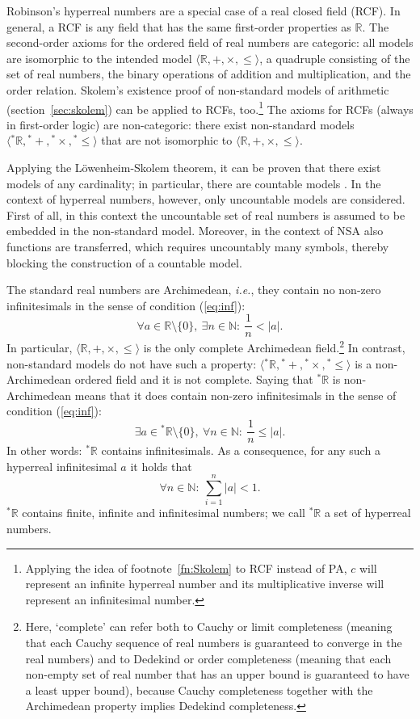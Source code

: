 Robinson's hyperreal numbers are a special case of a real closed field (RCF). In general, a RCF is any field that has the same first-order properties as $\mathbb{R}$.
The second-order axioms for the ordered field of real numbers are categoric: all models are isomorphic to the intended model $\langle \mathbb{R}, +, \times, \leq \rangle$, a quadruple consisting of the set of real numbers, the binary operations of addition and multiplication, and the order relation.
Skolem's existence proof of non-standard models of arithmetic (section~\ref{sec:skolem}) can be applied to RCFs, too.\footnote{Applying the idea of footnote~\ref{fn:Skolem} to RCF instead of PA, $c$ will represent an infinite hyperreal number and its multiplicative inverse will represent an infinitesimal number.}
The axioms for RCFs (always in first-order logic) are non-categoric: there exist non-standard models $\langle {^\ast\mathbb{R}}, {^\ast +}, {^\ast \times}, {^\ast \! \leq} \rangle$ that are not isomorphic to $\langle \mathbb{R}, +, \times, \leq \rangle$.

Applying the L\"{o}wenheim-Skolem theorem, it can be proven that there exist models of any cardinality; in particular, there are countable models \citep[\textit{cf.}\ the `paradox' of][]{Skolem:1922}.
In the context of hyperreal numbers, however, only uncountable models are considered. First of all, in this context the uncountable set of real numbers is assumed to be embedded in the non-standard model. Moreover, in the context of NSA also functions are transferred, which requires uncountably many symbols, thereby blocking the construction of a countable model.

The standard real numbers are Archimedean, \textit{i.e.}, they contain no non-zero infinitesimals in the sense of condition (\ref{eq:inf}):
\begin{equation}
	\forall a \in \mathbb{R} \setminus \{0\}, \ \exists n \in \mathbb{N} : \ \frac{1}{n} < | a |.\label{eq:Arch}
\end{equation}
In particular, $\langle \mathbb{R}, +, \times, \leq \rangle$ is the only complete Archimedean field.\footnote{Here, `complete' can refer both to Cauchy or limit completeness (meaning that each Cauchy sequence of real numbers is guaranteed to converge in the real numbers) and to Dedekind or order completeness (meaning that each non-empty set of real number that has an upper bound is guaranteed to have a least upper bound), because Cauchy completeness together with the Archimedean property implies Dedekind completeness.}
In contrast, non-standard models do not have such a property: $\langle {^\ast\mathbb{R}}, {^\ast +}, {^\ast \times}, {^\ast \leq} \rangle$ is a non-Archimedean ordered field and it is not complete.
Saying that ${^\ast\mathbb{R}}$ is non-Archimedean means that it does contain non-zero infinitesimals in the sense of condition (\ref{eq:inf}):
$$
	\exists a \in {^\ast\mathbb{R}} \setminus \{0\}, \ \forall n \in \mathbb{N} : \ \frac{1}{n} \leq | a |.
$$
In other words: ${^\ast\mathbb{R}}$ contains infinitesimals. As a consequence, for any such a hyperreal infinitesimal $a$ it holds that
$$
	\forall n \in \mathbb{N} : \ \sum_{i=1}^{n} | a | < 1.
$$
${^\ast\mathbb{R}}$ contains finite, infinite and infinitesimal numbers; we call ${^\ast\mathbb{R}}$ a set of hyperreal numbers.

